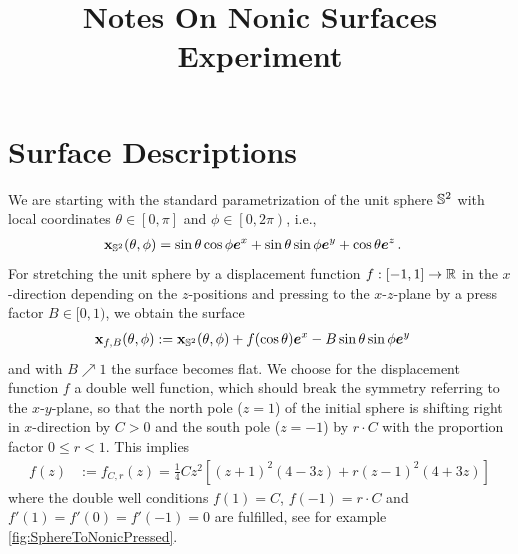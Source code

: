 \documentclass[a4paper,11pt]{scrartcl}
\title{Notes On Nonic Surfaces Experiment}
\newcommand{\EuBase}[1]{\eb^{#1}}
\newcommand{\pstretch}{C}
\newcommand{\pprop}{r}
\newcommand{\ppress}{B}
\begin{document}
\maketitle

\section{Surface Descriptions}
We are starting with the standard parametrization of the unit sphere \( \mathbb{S}^2 \)
with local coordinates \(  \theta\in\left[ 0,\pi \right]\) and \( \phi\in\left[ 0,2\pi\right) \), i.e.,
\begin{align}
      \Xb_{\Sp}(\theta,\phi) &= 
                      \sin\theta\cos\phi\EuBase{x} +  \sin\theta\sin\phi \EuBase{y} + \cos\theta\EuBase{z} \formPeriod
\end{align}
For stretching the unit sphere by a displacement function \( f:[-1,1] \rightarrow \mathbb{R} \) in the \( x \)-direction depending on the \( z
\)-positions 
and pressing to the \( x \)-\( z \)-plane by a press factor \( \ppress\in [0,1) \),
we obtain the surface
\begin{align}
  \Xb_{f,\ppress}(\theta,\phi) &:= \Xb_{\Sp}(\theta,\phi) + f(\cos\theta)\EuBase{x} - B\sin\theta\sin\phi\EuBase{y}
\end{align}
and with \( \ppress\nearrow 1 \) the surface becomes flat.
We choose for the displacement function \( f \) a double well function,
which should break the symmetry referring to the \( x \)-\( y \)-plane,
so that the north pole (\( z=1 \)) of the initial sphere is shifting right in  \( x \)-direction by \( \pstretch>0 \)
and the south pole (\( z=-1 \)) by \( \pprop\cdot\pstretch  \) with the proportion factor \( 0 \le \pprop < 1 \).
This implies
\begin{align}
  f(z) &:= f_{\pstretch,\pprop}(z) = \frac{1}{4} \pstretch z^2 \left[(z+1)^2 (4-3 z)+\pprop (z-1)^2 (4+3 z)\right]
\end{align}
where the double well conditions \( f(1) = \pstretch \), \( f(-1)=\pprop\cdot\pstretch \) and \( f'(1)=f'(0)=f'(-1)=0 \) are fulfilled,
see for example \autoref{fig:SphereToNonicPressed}.
\end{document}
